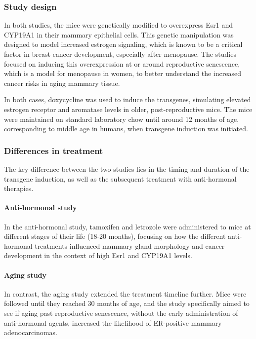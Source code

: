 \subsubsection{Study design}
In both studies, the mice were genetically modified to overexpress Esr1 and
CYP19A1 in their mammary epithelial cells.
This genetic manipulation was designed to model increased estrogen signaling,
which is known to be a critical factor in breast cancer development, especially
after menopause\supercite{furth_esr1_2023,furth_overexpression_2023}.
The studies focused on inducing this overexpression at or around reproductive
senescence, which is a model for menopause in women, to better understand the
increased cancer risks in aging mammary
tissue\supercite{furth_esr1_2023,furth_overexpression_2023}.

In both cases, doxycycline was used to induce the transgenes, simulating
elevated estrogen receptor and aromatase levels in older, post-reproductive
mice.
The mice were maintained on standard laboratory chow until around 12 months of
age, corresponding to middle age in humans, when transgene induction was
initiated\supercite{furth_esr1_2023,furth_overexpression_2023}.

\subsubsection{Differences in treatment}
The key difference between the two studies lies in the timing and duration of
the transgene induction, as well as the subsequent treatment with anti-hormonal
therapies.

\paragraph{Anti-hormonal study}
In the anti-hormonal study, tamoxifen and letrozole were administered to mice
at different stages of their life (18-20 months), focusing on how the different
anti-hormonal treatments influenced mammary gland morphology and cancer
development in the context of high Esr1 and CYP19A1
levels\supercite{furth_esr1_2023}.

\paragraph{Aging study}
In contrast, the aging study extended the treatment timeline further.
Mice were followed until they reached 30 months of age, and the study
specifically aimed to see if aging past reproductive senescence, without the
early administration of anti-hormonal agents, increased the likelihood of
ER-positive mammary adenocarcinomas\supercite{furth_overexpression_2023}.

